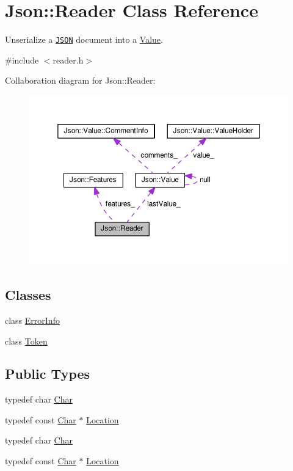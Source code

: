 \hypertarget{classJson_1_1Reader}{\section{Json\-:\-:Reader Class Reference}
\label{d1/d62/classJson_1_1Reader}
}


Unserialize a \href{http://www.json.org}{\tt J\-S\-O\-N} document into a \hyperlink{classJson_1_1Value}{Value}.  




{\ttfamily \#include $<$reader.\-h$>$}



Collaboration diagram for Json\-:\-:Reader\-:
\nopagebreak
\begin{figure}[H]
\begin{center}
\leavevmode
\includegraphics[width=350pt]{d3/d59/classJson_1_1Reader__coll__graph}
\end{center}
\end{figure}
\subsection*{Classes}
\begin{DoxyCompactItemize}
\item 
class \hyperlink{classJson_1_1Reader_1_1ErrorInfo}{Error\-Info}
\item 
class \hyperlink{classJson_1_1Reader_1_1Token}{Token}
\end{DoxyCompactItemize}
\subsection*{Public Types}
\begin{DoxyCompactItemize}
\item 
typedef char \hyperlink{classJson_1_1Reader_a3eec9118f3e9a672ba8348c3a79d0f45}{Char}
\item 
typedef const \hyperlink{classJson_1_1Reader_a3eec9118f3e9a672ba8348c3a79d0f45}{Char} $\ast$ \hyperlink{classJson_1_1Reader_a46795b5b272bf79a7730e406cb96375a}{Location}
\item 
typedef char \hyperlink{classJson_1_1Reader_a3eec9118f3e9a672ba8348c3a79d0f45}{Char}
\item 
typedef const \hyperlink{classJson_1_1Reader_a3eec9118f3e9a672ba8348c3a79d0f45}{Char} $\ast$ \hyperlink{classJson_1_1Reader_a46795b5b272bf79a7730e406cb96375a}{Location}
\end{DoxyCompactItemize}
